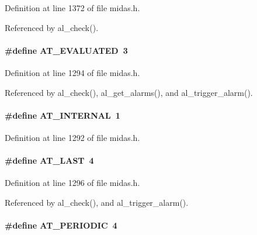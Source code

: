 Definition at line 1372 of file midas.h.

Referenced by al\_\-check().
\paragraph[{AT\_\-EVALUATED}]{\setlength{\rightskip}{0pt plus 5cm}\#define AT\_\-EVALUATED~3}\hfill\label{group__malarmh_gabd367ea3feeb6b3fe27aaf45e9a067f6}

\begin{DoxyItemize}
\item 
\end{DoxyItemize}

Definition at line 1294 of file midas.h.

Referenced by al\_\-check(), al\_\-get\_\-alarms(), and al\_\-trigger\_\-alarm().
\paragraph[{AT\_\-INTERNAL}]{\setlength{\rightskip}{0pt plus 5cm}\#define AT\_\-INTERNAL~1}\hfill\label{group__malarmh_ga0aecd2654d62ebd6b3d8d57ef8ccf2d9}

\begin{DoxyItemize}
\item 
\end{DoxyItemize}

Definition at line 1292 of file midas.h.
\paragraph[{AT\_\-LAST}]{\setlength{\rightskip}{0pt plus 5cm}\#define AT\_\-LAST~4}\hfill\label{group__malarmh_ga5f102004d1642b0878502f7a6a05fdfa}

\begin{DoxyItemize}
\item 
\end{DoxyItemize}

Definition at line 1296 of file midas.h.

Referenced by al\_\-check(), and al\_\-trigger\_\-alarm().
\paragraph[{AT\_\-PERIODIC}]{\setlength{\rightskip}{0pt plus 5cm}\#define AT\_\-PERIODIC~4}\hfill\label{group__malarmh_ga40d5f5ba688496ddaa6f12e9a9b9f956}

